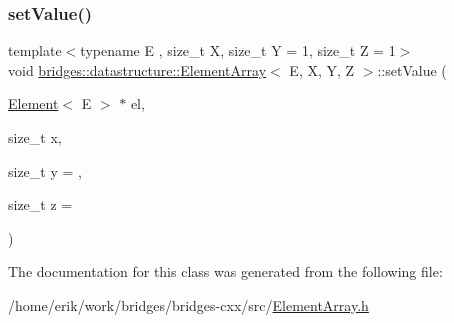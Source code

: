 \mbox{\label{classbridges_1_1datastructure_1_1_element_array_aecd1e6ae5a15c74837f2bfe9d7fbeb60}} 
\subsubsection{\texorpdfstring{set\+Value()}{setValue()}}
{\footnotesize\ttfamily template$<$typename E , size\+\_\+t X, size\+\_\+t Y = 1, size\+\_\+t Z = 1$>$ \\
void \hyperlink{classbridges_1_1datastructure_1_1_element_array}{bridges\+::datastructure\+::\+Element\+Array}$<$ E, X, Y, Z $>$\+::set\+Value (\begin{DoxyParamCaption}\item[{\hyperlink{classbridges_1_1datastructure_1_1_element}{Element}$<$ E $>$ $\ast$}]{el,  }\item[{size\+\_\+t}]{x,  }\item[{size\+\_\+t}]{y = {},  }\item[{size\+\_\+t}]{z = {} }\end{DoxyParamCaption})\hspace{0.3cm}{\ttfamily [inline]}}



The documentation for this class was generated from the following file\+:\begin{DoxyCompactItemize}
\item 
/home/erik/work/bridges/bridges-\/cxx/src/\hyperlink{_element_array_8h}{Element\+Array.\+h}\end{DoxyCompactItemize}
